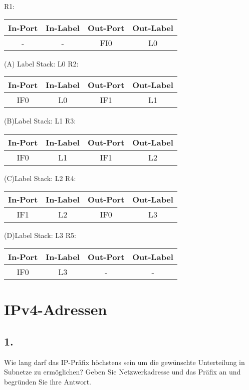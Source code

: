 \documentclass[paper=a4, fontsize=11pt]{scrartcl}
\numberwithin{equation}{section}
\numberwithin{figure}{section}
\numberwithin{table}{section}
\begin{document}
R1:\newline
\begin{tabular}{c|c|c|c}
In-Port & In-Label & Out-Port & Out-Label \\\hline
- & - & FI0 & L0\\
\end{tabular}\newline
(A) Label Stack: L0\newline
R2:\newline
\begin{tabular}{c|c|c|c}
In-Port & In-Label & Out-Port & Out-Label \\\hline
IF0 & L0 & IF1 & L1\\
\end{tabular}\newline
(B)Label Stack: L1\newline
R3:\newline
\begin{tabular}{c|c|c|c}
In-Port & In-Label & Out-Port & Out-Label \\\hline
IF0 & L1 & IF1 & L2\\
\end{tabular}\newline
(C)Label Stack: L2\newline
R4:\newline
\begin{tabular}{c|c|c|c}
In-Port & In-Label & Out-Port & Out-Label \\\hline
IF1 & L2 & IF0 & L3\\
\end{tabular}\newline
(D)Label Stack: L3\newline
R5:\newline
\begin{tabular}{c|c|c|c}
In-Port & In-Label & Out-Port & Out-Label \\\hline
IF0 & L3 & - & -\\
\end{tabular}\newline

\section{IPv4-Adressen}

\subsection{1.}
Wie lang darf das IP-Präfix höchstens sein um die gewünschte Unterteilung in Subnetze zu ermöglichen? Geben Sie Netzwerkadresse und das Präfix an und begründen Sie ihre Antwort. \\
\end{document}
